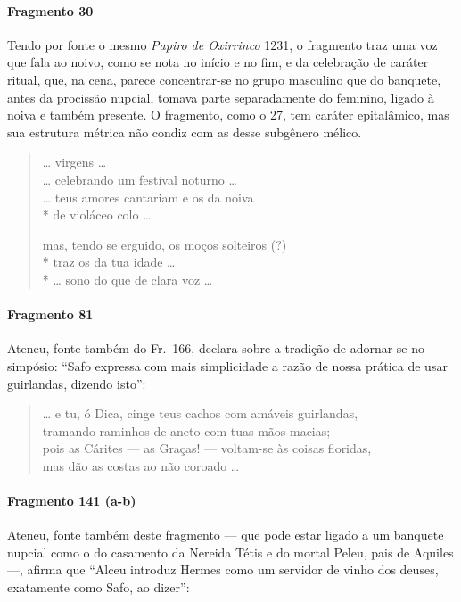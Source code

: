 {\paragraph{Fragmento 30}

{\small Tendo por fonte o mesmo \textit{Papiro de Oxirrinco} 1231, o fragmento traz uma
voz que fala ao noivo, como se nota no início e no fim, e da celebração de
caráter ritual, que, na cena, parece concentrar-se no grupo masculino que do
banquete, antes da procissão nupcial, tomava parte separadamente do feminino,
ligado à noiva e também presente. O fragmento, como o 27, tem caráter
epitalâmico, mas sua estrutura métrica não condiz com as desse subgênero
mélico.}

\begin{verse}
\ldots{} virgens \ldots{}\\
\ldots{} celebrando um festival noturno \ldots{}\\
\ldots{} teus amores cantariam e os da noiva\\*
de violáceo colo \ldots{}

mas, tendo se erguido, os moços solteiros (?)\\*
traz os da tua idade \ldots{}\\*
\ldots{} sono do que de clara voz \ldots{}
\end{verse}

\paragraph{Fragmento 81}

{\small Ateneu, fonte também do Fr.~166, declara sobre a tradição de adornar-se no
simpósio: ``Safo expressa com mais simplicidade a razão de nossa prática
de usar guirlandas, dizendo isto”:}

\begin{verse}
\ldots{} e tu, ó Dica, cinge teus cachos com amáveis \qb{}guirlandas,\\
tramando raminhos de aneto com tuas mãos macias;\\
pois as Cárites --- as Graças! --- voltam-se às coisas \qb{}floridas,\\
mas dão as costas ao não coroado \ldots{}
\end{verse}

\paragraph{Fragmento 141 (a-b)}

{\small Ateneu, fonte também deste fragmento --- que pode estar ligado a um banquete
nupcial como o do casamento da Nereida Tétis e do mortal Peleu, pais de Aquiles
---, afirma que ``Alceu introduz Hermes como um servidor de vinho dos
deuses, exatamente como Safo, ao dizer'':}

}
